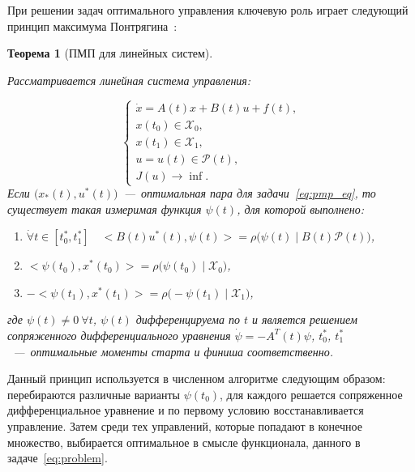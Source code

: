 \documentclass[12pt, a4paper]{article} %
\newtheorem{Th}{Теорема}
\newcommand{\inner}[2]{\bigl< #1, #2 \bigr>}
\begin{document}
При решении задач оптимального управления ключевую роль играет следующий 
принцип максимума Понтрягина~\cite{Rouble}:

\begin{Th}[ПМП для линейных систем]\label{th:pmp}

    Рассматривается линейная система управления:

    \begin{equation}\label{eq:pmp_eq}
        \begin{cases}
            \dot{x} = A(t)x + B(t)u + f(t), \\
            x(t_0) \in \mathcal{X}_0, \\
            x(t_1) \in \mathcal{X}_1, \\
            u = u(t) \in \mathcal{P}(t), \\
            J(u) \rightarrow \inf.
        \end{cases}         
    \end{equation} 
    Если $\bigl( x_*(t), u^*(t) \bigr)$~---~оптимальная пара для задачи~\eqref{eq:pmp_eq}, то существует
    такая измеримая функция $\psi(t)$, для которой выполнено:
    \begin{enumerate}
        \item[(УМ)]\label{pmp:um} $\dot{\forall} t \in [t_0^*, t_1^*] \quad
            \inner{B(t)u^*(t)}{\psi(t)} = 
            \rho \bigl(\psi(t) \mid B(t)\mathcal{P}(t)\bigr)$,
        \item[(Т1)]\label{pmp:t1} $\inner{\psi(t_0)}{x^*(t_0)} = 
            \rho\bigl( \psi(t_0) \mid \mathcal{X}_0 \bigr)$,
        \item[(Т2)]\label{pmp:t2} $-\inner{\psi(t_1)}{x^*(t_1)} = 
            \rho\bigl( -\psi(t_1) \mid \mathcal{X}_1 \bigr)$,
    \end{enumerate} 
    где $\psi(t) \neq 0\ \forall t$, $\psi(t)$ дифференцируема по $t$ и
    является решением сопряженного дифференциального уравнения $\dot{\psi} = -A^T(t)\psi$,
    $t_0^*$, $t_1^*$~---~оптимальные моменты старта и финиша соответственно.
\end{Th} 

Данный принцип используется в численном алгоритме следующим образом:
перебираются различные варианты $\psi(t_0)$, для каждого решается 
сопряженное дифференциальное уравнение и по первому условию восстанавливается
управление.
Затем среди тех управлений, которые попадают в конечное множество,
выбирается оптимальное в смысле функционала, данного в задаче~\eqref{eq:problem}.
\end{document}
